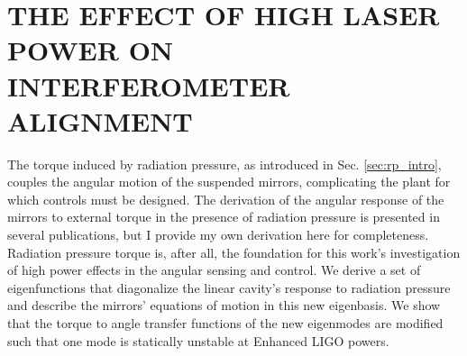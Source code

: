\chapter{THE EFFECT OF HIGH LASER POWER ON INTERFEROMETER ALIGNMENT}
\label{ch:eigenmodes}



The torque induced by radiation pressure, as introduced in
Sec. \ref{sec:rp_intro}, couples the angular motion of the suspended
mirrors, complicating the plant for which controls must be
designed. The derivation of the angular response of the mirrors to
external torque in the presence of radiation pressure is presented in
several publications, but I provide my own derivation here for
completeness. Radiation pressure torque is, after all, the foundation
for this work's investigation of high power effects in the angular
sensing and control. We derive a set of eigenfunctions that
diagonalize the linear cavity's response to radiation pressure and
describe the mirrors' equations of motion in this new eigenbasis. We
show that the torque to angle transfer functions of the new eigenmodes
are modified such that one mode is statically unstable at Enhanced
LIGO powers.






